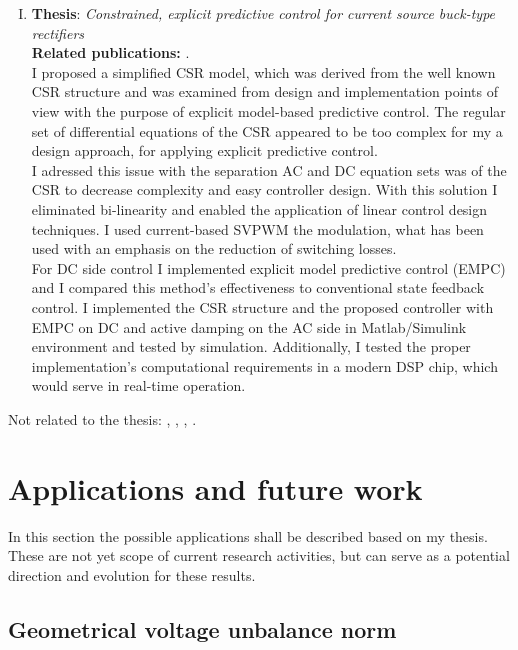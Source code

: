 \begin{enumerate}[I.)]
		\item\textbf{Thesis}: \emph{Constrained, explicit predictive control for current source buck-type rectifiers}\\
        \textbf{Related publications:} \cite{neukirchner2020constrained}.\\
    I proposed a simplified CSR model, which was derived from the well known CSR structure and was examined from design and implementation points of view with the purpose of explicit model-based predictive control. The regular set of differential equations of the CSR appeared to be too complex for my a design approach, for applying explicit predictive control. \\
		I adressed this issue with the separation AC and DC equation sets was of the CSR to decrease complexity and easy controller design. With this solution I eliminated bi-linearity and enabled the application of linear control design techniques. I used current-based SVPWM the modulation, what has been used with an emphasis on the reduction of switching losses. \\
		For DC side control I implemented explicit model predictive control (EMPC) and I compared this method's effectiveness to conventional state feedback control. I implemented the CSR structure and the proposed controller with EMPC on DC and active damping on the AC side in Matlab/Simulink environment and tested by simulation. Additionally, I tested the proper implementation's computational requirements in a modern DSP chip, which would serve in real-time operation.\\
	
\end{enumerate}

Not related to the thesis:  \cite{neukirchner2011modeling}, \cite{neukirchner2014quasi}, \cite{gollei2014measurement}, \cite{neukirchner2016modelling}.


		\section{Applications and future work}
		
		In this section the possible applications shall be described based on my thesis. These are not yet scope of current research activities, but can serve as a potential direction and evolution for these results.
		
		\subsection{Geometrical voltage unbalance norm}
		
